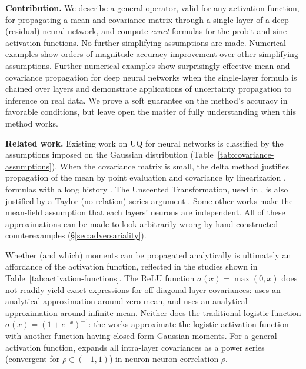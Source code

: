 \documentclass{article}
\begin{document}
\textbf{Contribution.} We describe a general operator, valid for any activation function, for propagating a mean and covariance matrix through a single layer of a deep (residual) neural network, and compute \emph{exact} formulas for the probit and sine activation functions.
No further simplifying assumptions are made.
Numerical examples show orders-of-magnitude accuracy improvement over other simplifying assumptions.
Further numerical examples show surprisingly effective mean and covariance propagation for deep neural networks when the single-layer formula is chained over layers and demonstrate applications of uncertainty propagation to inference on real data.
We prove a soft guarantee on the method's accuracy in favorable conditions, but leave open the matter of fully understanding when this method works.


\textbf{Related work.}
Existing work on UQ for neural networks is classified by the assumptions imposed on the Gaussian distribution (Table~\ref{tab:covariance-assumptions}).
When the covariance matrix is small, the delta method justifies propagation of the mean by point evaluation and covariance by linearization \cite{titensky_uncertainty_2018,nagel_kalman-bucy-informed_2022,petersen_uncertainty_2024,jungmann_analytical_2025}, formulas with a long history \citep[Chapter 187]{gauss_theory_1857} \citep{taylor_introduction_1997}.
The Unscented Transformation, used in \citet{astudillo_propagation_2011,abdelaziz_uncertainty_2015}, is also justified by a Taylor (no relation) series argument \citep{julier_scaled_2002}.
Some other works \citep{huber_bayesian_2020,wagner_kalman_2022,akgul_deterministic_2025} make the mean-field assumption that each layers' neurons are independent.
All of these approximations can be made to look arbitrarily wrong by hand-constructed counterexamples (\S\ref{sec:adversariality}).


Whether (and which) moments can be propagated analytically is ultimately an affordance of the activation function, reflected in the studies shown in Table~\ref{tab:activation-functions}.
The ReLU function \(\sigma(x) = \max(0, x)\) does not readily yield exact expressions for off-diagonal layer covariances:
\citet{bibi_analytic_2018} uses an analytical approximation around zero mean, and \citet{wu_deterministic_2019} uses an analytical approximation around infinite mean.
Neither does the traditional logistic function \(\sigma(x) = (1 + e^{-x})^{-1}\):
the works  \citet{astudillo_propagation_2011,abdelaziz_uncertainty_2015,huber_bayesian_2020} approximate the logistic activation function with another function having closed-form Gaussian moments.
For a general activation function, 
\citet{wright_analytic_2024} expands all intra-layer covariances as a power series (convergent for \(\rho \in (-1, 1)\)) in neuron-neuron correlation \(\rho\).
\end{document}
